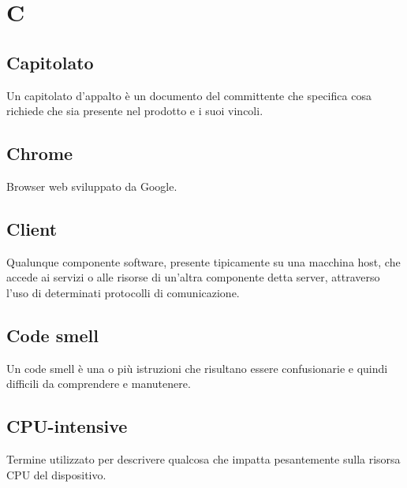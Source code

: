 \section{C}
	\subsection{Capitolato}
		Un capitolato d'appalto è un documento del committente che specifica cosa richiede che sia presente nel prodotto e i suoi vincoli.
	\subsection{Chrome}  
		Browser web sviluppato da Google.
	\subsection{Client}
		 Qualunque componente software, presente tipicamente su una macchina host, che accede ai servizi o alle risorse di un'altra componente detta server, attraverso l'uso di determinati protocolli di comunicazione.
	\subsection{Code smell} 
		Un code smell è una o più istruzioni che risultano essere confusionarie e quindi difficili da comprendere e manutenere.
	\subsection{CPU-intensive}
		Termine utilizzato per descrivere qualcosa che impatta pesantemente sulla risorsa CPU del dispositivo.
	
\newpage
